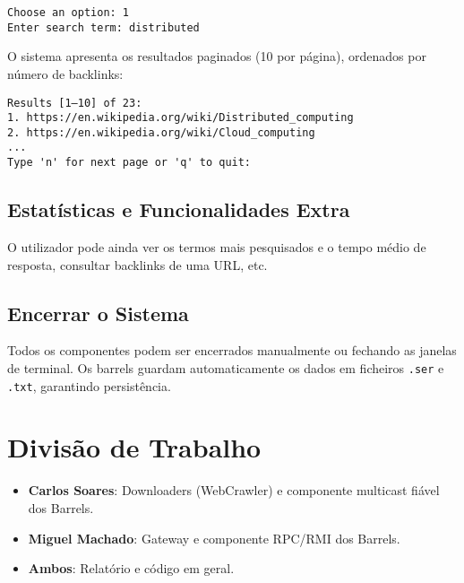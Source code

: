\documentclass{article}
\begin{document}
\begin{lstlisting}
Choose an option: 1
Enter search term: distributed
\end{lstlisting}

O sistema apresenta os resultados paginados (10 por página), ordenados por número de backlinks:

\begin{lstlisting}
Results [1–10] of 23:
1. https://en.wikipedia.org/wiki/Distributed_computing
2. https://en.wikipedia.org/wiki/Cloud_computing
...
Type 'n' for next page or 'q' to quit:
\end{lstlisting}

\subsection{Estatísticas e Funcionalidades Extra}

O utilizador pode ainda ver os termos mais pesquisados e o tempo médio de resposta, consultar backlinks de uma URL, etc.

\subsection{Encerrar o Sistema}

Todos os componentes podem ser encerrados manualmente ou fechando as janelas de terminal. Os barrels guardam automaticamente os dados em ficheiros \texttt{.ser} e \texttt{.txt}, garantindo persistência.













\newpage
\section{Divisão de Trabalho}
\begin{itemize}
    \item \textbf{Carlos Soares}:   Downloaders (WebCrawler) e  componente multicast fiável dos Barrels.
    \item \textbf{Miguel Machado}: Gateway e componente RPC/RMI dos Barrels.
    \item \textbf{Ambos}: Relatório e código em geral.
\end{itemize}
\end{document}
